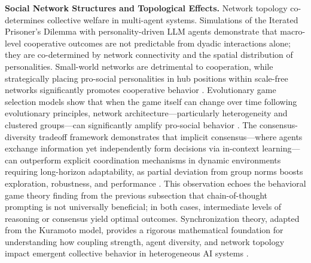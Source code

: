 \documentclass[11pt]{article}
\begin{document}
\textbf{Social Network Structures and Topological Effects.} Network topology co-determines collective welfare in multi-agent systems. Simulations of the Iterated Prisoner's Dilemma with personality-driven LLM agents demonstrate that macro-level cooperative outcomes are not predictable from dyadic interactions alone; they are co-determined by network connectivity and the spatial distribution of personalities. Small-world networks are detrimental to cooperation, while strategically placing pro-social personalities in hub positions within scale-free networks significantly promotes cooperative behavior \cite{ref257}. Evolutionary game selection models show that when the game itself can change over time following evolutionary principles, network architecture---particularly heterogeneity and clustered groups---can significantly amplify pro-social behavior \cite{ref258}. The consensus-diversity tradeoff framework demonstrates that implicit consensus---where agents exchange information yet independently form decisions via in-context learning---can outperform explicit coordination mechanisms in dynamic environments requiring long-horizon adaptability, as partial deviation from group norms boosts exploration, robustness, and performance \cite{ref84}. This observation echoes the behavioral game theory finding from the previous subsection that chain-of-thought prompting is not universally beneficial; in both cases, intermediate levels of reasoning or consensus yield optimal outcomes. Synchronization theory, adapted from the Kuramoto model, provides a rigorous mathematical foundation for understanding how coupling strength, agent diversity, and network topology impact emergent collective behavior in heterogeneous AI systems \cite{ref259}.
\end{document}
